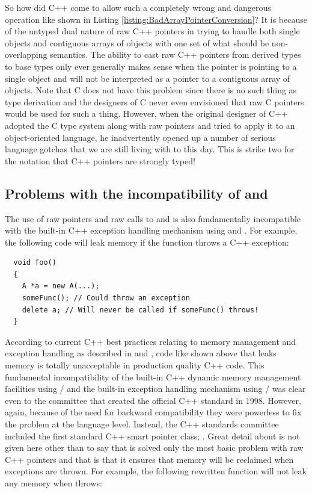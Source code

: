 \documentclass[pdf,ps2pdf,11pt]{SANDreport}
\begin{document}
So how did C++ come to allow such a completely wrong and dangerous
operation like shown in Listing
{}\ref{listing:BadArrayPointerConversion}?  It is because of the
untyped dual nature of raw C++ pointers in trying to handle both
single objects and contiguous arrays of objects with one set of what
should be non-overlapping semantics.  The ability to cast raw C++
pointers from derived types to base types only ever generally makes
sense when the pointer is pointing to a single object and will not be
interpreted as a pointer to a contiguous array of objects.  Note that
C does not have this problem since there is no such thing as type
derivation and the designers of C never even envisioned that raw C
pointers would be used for such a thing.  However, when the original
designer of C++ adopted the C type system along with raw pointers and
tried to apply it to an object-oriented language, he inadvertently
opened up a number of serious language gotchas that we are still
living with to this day.  This is strike two for the notation that C++
pointers are strongly typed!


%
{}\subsection{Problems with the incompatibility of
{} and {}}
%

The use of raw pointers and raw calls to {} and
{} is also fundamentally incompatible with the built-in
C++ exception handling mechanism using {} and
{}.  For example, the following code will leak memory
if the function {} throws a C++ exception:

{\small\begin{verbatim}
  void foo()
  {
    A *a = new A(...);
    someFunc(); // Could throw an exception
    delete a; // Will never be called if someFunc() throws!
  }
\end{verbatim}}

According to current C++ best practices relating to memory management
and exception handling as described in {}\cite[Item
{}\#29]{EffectiveC++ThirdEdition} and {}\cite[Item
{}\#71]{C++CodingStandards05}, code like shown above that leaks memory
is totally unacceptable in production quality C++ code.  This
fundamental incompatibility of the built-in C++ dynamic memory
management facilities using {}/ and the built-in
exception handling mechanism using {}/ was clear
even to the committee that created the official C++ standard in 1998.
However, again, because of the need for backward compatibility they
were powerless to fix the problem at the language level.  Instead, the
C++ standards committee included the first standard C++ smart pointer
class; {}.  Great detail about {} is not
given here other than to say that is solved only the most basic
problem with raw C++ pointers and that is that it ensures that memory
will be reclaimed when exceptions are thrown.  For example, the
following rewritten function will not leak any memory when
{} throws:
\end{document}
